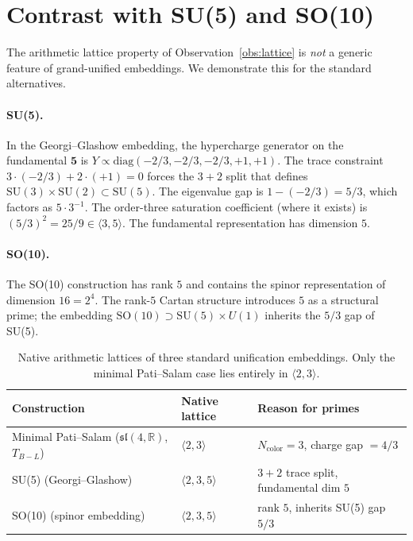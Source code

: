 \documentclass[11pt]{article}
\theoremstyle{plain}
\theoremstyle{remark}
\newcommand{\sln}[1]{\mathfrak{sl}(#1,\mathbb{R})}
\newcommand{\TBL}{T_{B\!-\!L}}
\begin{document}
\section{Contrast with SU(5) and SO(10)}

The arithmetic lattice property of Observation~\ref{obs:lattice} is
\emph{not} a generic feature of grand-unified embeddings.  We
demonstrate this for the standard alternatives.

\paragraph{SU(5).}  In the Georgi--Glashow embedding, the
hypercharge generator on the fundamental $\mathbf{5}$ is
$Y \propto \mathrm{diag}(-2/3, -2/3, -2/3, +1, +1)$.  The trace
constraint $3 \cdot (-2/3) + 2 \cdot (+1) = 0$ forces the
$3 + 2$ split that defines $\mathrm{SU}(3) \times \mathrm{SU}(2)
\subset \mathrm{SU}(5)$.  The eigenvalue gap is
$1 - (-2/3) = 5/3$, which factors as $5 \cdot 3^{-1}$.  The
order-three saturation coefficient (where it exists) is
$(5/3)^2 = 25/9 \in \langle 3, 5 \rangle$.  The fundamental
representation has dimension $5$.

\paragraph{SO(10).}  The SO(10) construction has rank $5$ and
contains the spinor representation of dimension $16 = 2^4$.  The
rank-$5$ Cartan structure introduces $5$ as a structural prime; the
embedding $\mathrm{SO}(10) \supset \mathrm{SU}(5) \times U(1)$
inherits the $5/3$ gap of SU(5).

\begin{table}[h]
\centering
\small
\begin{tabular}{lll}
\toprule
Construction & Native lattice & Reason for primes \\
\midrule
Minimal Pati--Salam ($\sln{4}$, $\TBL$) & $\langle 2, 3 \rangle$
  & $N_{\mathrm{color}} = 3$, charge gap $= 4/3$ \\
SU(5) (Georgi--Glashow) & $\langle 2, 3, 5 \rangle$
  & $3 + 2$ trace split, fundamental dim $5$ \\
SO(10) (spinor embedding) & $\langle 2, 3, 5 \rangle$
  & rank $5$, inherits SU(5) gap $5/3$ \\
\bottomrule
\end{tabular}
\caption{Native arithmetic lattices of three standard unification
embeddings.  Only the minimal Pati--Salam case lies entirely in
$\langle 2, 3 \rangle$.}
\label{tab:lattice-comparison}
\end{table}
\end{document}
